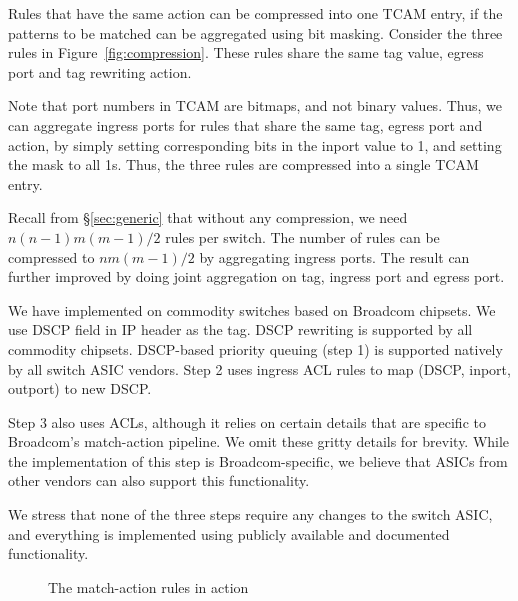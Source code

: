 Rules that have the same action can be compressed into one TCAM entry, if the
patterns to be matched can be aggregated using bit masking. Consider the three
rules in Figure~\ref{fig:compression}. These rules share the same tag value,
egress port and tag rewriting action.

Note that port numbers in TCAM are bitmaps, and not binary values. Thus, we can
aggregate ingress ports for rules that share the same tag, egress port and
action, by simply setting corresponding bits in the inport value to 1, and
setting the mask to all 1s. Thus, the three \sysname{} rules are compressed into
a single TCAM entry.

Recall from \S\ref{sec:generic} that without any compression, we need
$n(n-1)m(m-1)/2$ rules per switch. The number of rules can be
compressed to $nm(m-1)/2$ by aggregating ingress ports.  The
result can further improved by doing joint aggregation on tag, ingress port and
egress port.

 We have implemented \sysname{} on commodity
switches based on Broadcom chipsets.  We use DSCP field in IP header as the tag.
DSCP rewriting is supported by all commodity chipsets. DSCP-based priority
queuing (step 1) is supported natively by all switch ASIC vendors. Step 2 uses
ingress ACL rules to map (DSCP, inport, outport) to new DSCP.

Step 3 also uses ACLs, although it relies on certain details that are specific
to Broadcom's match-action pipeline. We omit these gritty details for brevity.
While the implementation of this step is Broadcom-specific, we believe that
ASICs from other vendors can also support this functionality.

We stress that none of the three steps require any changes to the switch ASIC,
and everything is implemented using publicly available and documented
functionality.

\begin{figure}[t]
	\centering
	
	
	\caption{The match-action rules in action}\label{fig:tagger_demon}
\end{figure}


